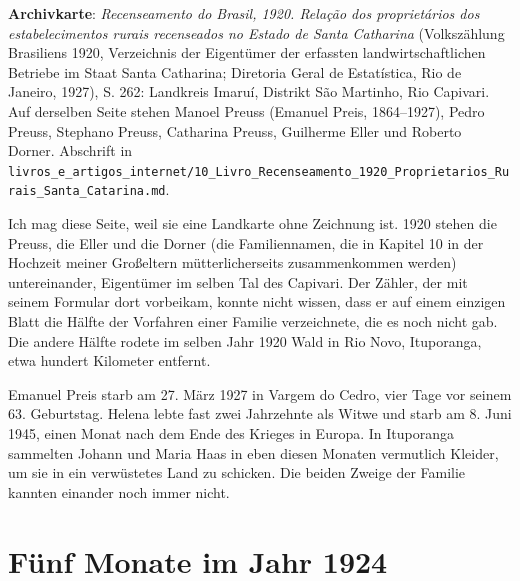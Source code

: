 \documentclass[
  ngerman,
  11pt,
  openany]{book}
\begin{document}
\begin{ficha}

\textbf{Archivkarte}: \emph{Recenseamento do Brasil, 1920. Relação dos
proprietários dos estabelecimentos rurais recenseados no Estado de Santa
Catharina} (Volkszählung Brasiliens 1920, Verzeichnis der Eigentümer der
erfassten landwirtschaftlichen Betriebe im Staat Santa Catharina;
Diretoria Geral de Estatística, Rio de Janeiro, 1927), S. 262: Landkreis
Imaruí, Distrikt São Martinho, Rio Capivari. Auf derselben Seite stehen
Manoel Preuss (Emanuel Preis, 1864--1927), Pedro Preuss, Stephano
Preuss, Catharina Preuss, Guilherme Eller und Roberto Dorner. Abschrift
in
\texttt{livros\_e\_artigos\_internet/10\_Livro\_Recenseamento\_1920\_Proprietarios\_Rurais\_Santa\_Catarina.md}.

\end{ficha}

Ich mag diese Seite, weil sie eine Landkarte ohne Zeichnung ist. 1920
stehen die Preuss, die Eller und die Dorner (die Familiennamen, die in
Kapitel 10 in der Hochzeit meiner Großeltern mütterlicherseits
zusammenkommen werden) untereinander, Eigentümer im selben Tal des
Capivari. Der Zähler, der mit seinem Formular dort vorbeikam, konnte
nicht wissen, dass er auf einem einzigen Blatt die Hälfte der Vorfahren
einer Familie verzeichnete, die es noch nicht gab. Die andere Hälfte
rodete im selben Jahr 1920 Wald in Rio Novo, Ituporanga, etwa hundert
Kilometer entfernt.

Emanuel Preis starb am 27. März 1927 in Vargem do Cedro, vier Tage vor
seinem 63. Geburtstag. Helena lebte fast zwei Jahrzehnte als Witwe und
starb am 8. Juni 1945, einen Monat nach dem Ende des Krieges in Europa.
In Ituporanga sammelten Johann und Maria Haas in eben diesen Monaten
vermutlich Kleider, um sie in ein verwüstetes Land zu schicken. Die
beiden Zweige der Familie kannten einander noch immer nicht.

\section{Fünf Monate im Jahr 1924}\label{fuxfcnf-monate-im-jahr-1924}
\end{document}
